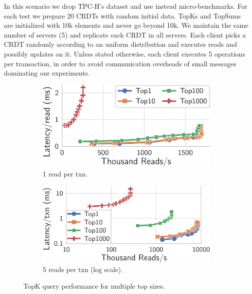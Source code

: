 \documentclass[sigplan,review,anonymous]{acmart}
\begin{document}
In this scenario we drop TPC-H's dataset and use instead micro-benchmarks.
For each test we prepare 20 CRDTs with random initial data.
TopKs and TopSums are initialized with 10k elements and never go beyond 10k.
We maintain the same number of servers (5) and replicate each CRDT in all servers.
Each client picks a CRDT randomly according to an uniform distribution and executes reads and possibly updates on it.
Unless stated otherwise, each client executes 5 operations per transaction, in order to avoid communication overheads of small messages dominating our experiments.


\begin{figure}
	\centering
	\begin{subfigure}{.481\linewidth}
		\includegraphics[width=1\linewidth]{singleQuery/bench_top_size_0_upd}
		\caption{1 read per txn.}
		\label{fig:topSize_single}
	\end{subfigure}%
	\hspace*{0.2em}
	\begin{subfigure}{.499\linewidth}
		\includegraphics[width=1\linewidth]{singleQuery/bench_top_size_0_upd_5b}
		\caption{5 reads per txn (log scale).}
		\label{fig:topSize_batch}
	\end{subfigure}%
	\vspace*{-0.65em}
	\caption{TopK query performance for multiple top sizes.}
	\label{fig:topSize}
	\vspace*{-0.2em} %
\end{figure}
\end{document}
